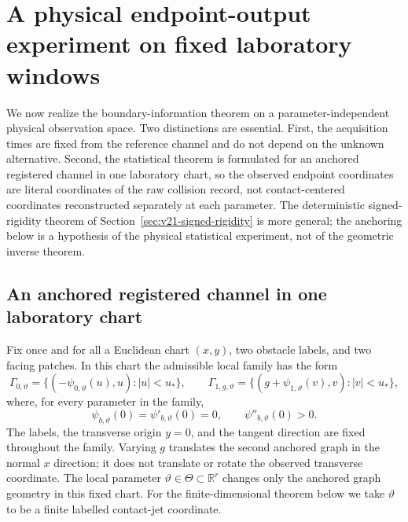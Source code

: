\section{A physical endpoint-output experiment on fixed laboratory windows}
\label{sec:v21-raw-physical}

We now realize the boundary-information theorem on a parameter-independent
physical observation space.  Two distinctions are essential.  First, the
acquisition times are fixed from the reference channel and do not depend on
the unknown alternative.  Second, the statistical theorem is formulated for
an anchored registered channel in one laboratory chart, so the observed
endpoint coordinates are literal coordinates of the raw collision record,
not contact-centered coordinates reconstructed separately at each parameter.
The deterministic signed-rigidity theorem of
Section~\ref{sec:v21-signed-rigidity} is more general; the anchoring below is
a hypothesis of the physical statistical experiment, not of the geometric
inverse theorem.

\subsection{An anchored registered channel in one laboratory chart}

Fix once and for all a Euclidean chart $(x,y)$, two obstacle labels, and two
facing patches.  In this chart the admissible local family has the form
\begin{equation}\label{eq:v21-anchored-graphs}
 \Gamma_{0,\vartheta}=\{(-\psi_{0,\vartheta}(u),u):|u|<u_*\},
 \qquad
 \Gamma_{1,g,\vartheta}=\{(g+\psi_{1,\vartheta}(v),v):|v|<u_*\},
\end{equation}
where, for every parameter in the family,
\begin{equation}\label{eq:v21-anchor-normalization}
 \psi_{b,\vartheta}(0)=\psi'_{b,\vartheta}(0)=0,
 \qquad
 \psi''_{b,\vartheta}(0)>0.
\end{equation}
The labels, the transverse origin $y=0$, and the tangent direction are fixed
throughout the family.  Varying $g$ translates the second anchored graph in
the normal $x$ direction; it does not translate or rotate the observed
transverse coordinate.  The local parameter $\vartheta\in\Theta\subset
\mathbb R^r$ changes only the anchored graph geometry in this fixed chart.
For the finite-dimensional theorem below we take $\vartheta$ to be a finite
labelled contact-jet coordinate.

